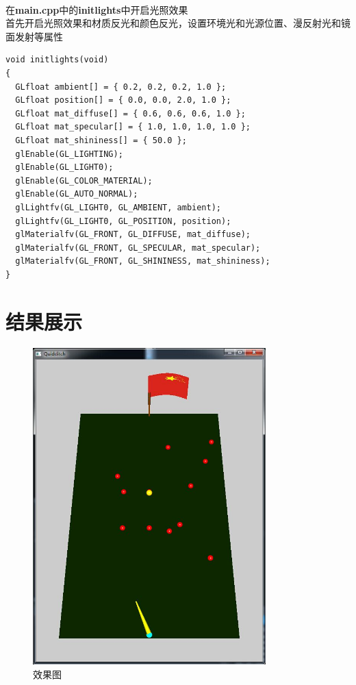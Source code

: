 \documentclass{article}
\begin{document}
            \paragraph{}
            在\textbf{main.cpp}中的\textbf{initlights}中开启光照效果\\
            首先开启光照效果和材质反光和颜色反光，设置环境光和光源位置、漫反射光和镜面发射等属性
            \begin{lstlisting}[language={[ANSI]C}]
void initlights(void)
{
  GLfloat ambient[] = { 0.2, 0.2, 0.2, 1.0 };
  GLfloat position[] = { 0.0, 0.0, 2.0, 1.0 };
  GLfloat mat_diffuse[] = { 0.6, 0.6, 0.6, 1.0 };
  GLfloat mat_specular[] = { 1.0, 1.0, 1.0, 1.0 };
  GLfloat mat_shininess[] = { 50.0 };
  glEnable(GL_LIGHTING);
  glEnable(GL_LIGHT0);
  glEnable(GL_COLOR_MATERIAL);
  glEnable(GL_AUTO_NORMAL);
  glLightfv(GL_LIGHT0, GL_AMBIENT, ambient);
  glLightfv(GL_LIGHT0, GL_POSITION, position);
  glMaterialfv(GL_FRONT, GL_DIFFUSE, mat_diffuse);
  glMaterialfv(GL_FRONT, GL_SPECULAR, mat_specular);
  glMaterialfv(GL_FRONT, GL_SHININESS, mat_shininess);
}
            \end{lstlisting}
    \section{结果展示}
        \begin{figure}[bhtp]
                \begin{minipage}[bhtp!]{1\linewidth}\centering
                \includegraphics[width=9cm]{result.jpg}
                \caption{效果图}\label{1-a}
                \end{minipage}
        \end{figure}
\end{document}
